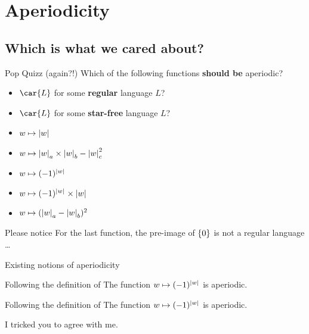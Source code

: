 \documentclass{beamer}
\begin{document}
\section{Aperiodicity}
\subsection{Which is what we cared about?}


\begin{frame}{Pop Quizz (again?!)}
    Which of the following functions \textbf{should be} aperiodic?
    \begin{itemize}
        \item $\car{L}$ for some \textbf{regular} language $L$? 
            \pause \hfill \nokmark
        \item $\car{L}$ for some \textbf{star-free} language $L$? 
            \pause \hfill \okmark
        \item $w \mapsto \size{w}$
            \pause \hfill \okmark
        \item $w \mapsto \size[a]{w} \times \size[b]{w} - \size[c]{w}^2$
            \pause \hfill \okmark
        \item $w \mapsto (-1)^{\size{w}}$
            \pause \hfill \nokmark
        \item $w \mapsto (-1)^{\size{w}} \times |w|$
            \pause \hfill \nokmark
        \item $w \mapsto (\size[a]{w} - \size[b]{w})^2$
            \pause \hfill \okmark
    \end{itemize}
    \pause
    \begin{alertblock}{Please notice}
        For the last function, the pre-image of $\{ {0} \}$ is not a regular
        language \ldots
    \end{alertblock}
\end{frame}

\begin{frame}{Existing notions of aperiodicity}
    \begin{block}{Following the definition of  \citeauthor{droste2019aperiodic} \cite{droste2019aperiodic}}
        The function $w \mapsto (-1)^{\size{w}}$ is aperiodic.
    \end{block}
    \pause
    \begin{block}{Following the definition of  \citeauthor{reutenauer_series_1980} \cite{reutenauer_series_1980}}
        The function $w \mapsto (-1)^{\size{w}}$ is aperiodic.
    \end{block}
    \pause
    I tricked you to agree with me.
\end{frame}
\end{document}
